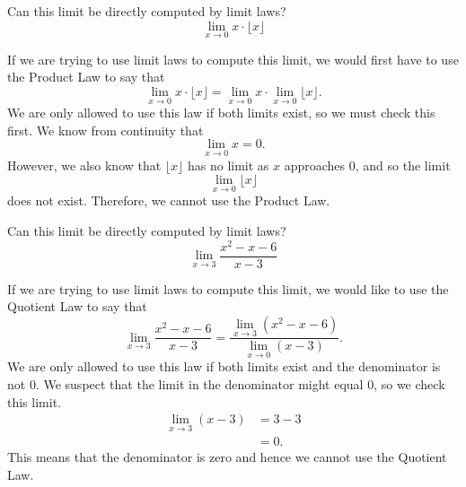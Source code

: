 \documentclass{ximera}
\begin{document}
\begin{question}
  Can this limit be directly computed by limit laws?
  \[
  \lim_{x\to 0} x\cdot \lfloor x \rfloor
  \]
  \begin{prompt}
  \begin{multipleChoice}
  \end{multipleChoice}
  \begin{feedback}
    If we are trying to use limit laws to compute this limit, we would
    first have to use the Product Law to say that
    \[
    \lim_{x\to 0}x\cdot \lfloor x \rfloor= \lim_{x\to 0} x \cdot \lim_{x\to 0} \lfloor x \rfloor.
    \]
    We are only allowed to use this law if both limits exist, so we
    must check this first.  We know from continuity that
    \[
    \lim_{x\to  0}x=0.
    \]
    However, we also know that $\lfloor x \rfloor$ has no limit as $x$ approaches $0$, and so the limit
    \[
    \lim_{x\to 0} \lfloor x \rfloor
    \]does not exist.  Therefore, we cannot use the
    Product Law.
  \end{feedback}
  \end{prompt}
\end{question}


\begin{question}
  Can this limit be directly computed by limit laws?
  \[
  \lim_{x\to 3} \frac{x^2-x-6}{x-3}
  \]
  \begin{prompt}
  \begin{multipleChoice}
  \end{multipleChoice}
  \begin{feedback}
    If we are trying to use limit laws to compute this limit, we would
    like to use the Quotient Law to say that
    \[
    \lim_{x\to 3} \frac{x^2-x-6}{x-3} = \frac{\lim_{x\to 3}
      (x^2-x-6)}{\lim_{x\to 0} (x-3)}.
    \]
    We are only allowed to use this law if both limits exist and the
    denominator is not $0$. We suspect that the limit in the
    denominator might equal $0$, so we check this limit.
    \begin{align*}
      \lim_{x\to 3} (x-3) &= 3-3\\
      &=0.
  \end{align*}
  This means that the denominator is zero and hence we cannot use the
  Quotient Law.
  \end{feedback}
  \end{prompt}
\end{question}
\end{document}
